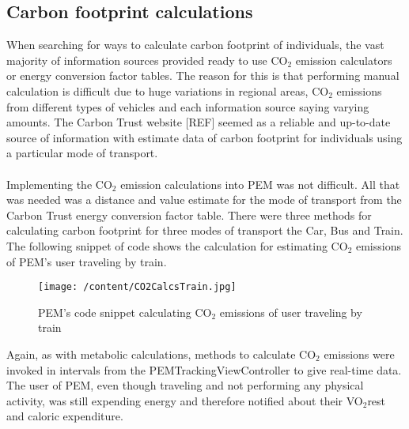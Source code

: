 \documentclass[12pt, a4paper]{report}   %
\begin{document}
\begin{enumerate}
\section{Carbon footprint calculations}
When searching for ways to calculate carbon footprint of individuals, the vast majority of information sources provided ready to use CO$_{2}$ emission calculators or energy conversion factor tables. The reason for this is that performing manual calculation is difficult due to huge variations in regional areas, CO$_{2}$ emissions from different types of vehicles and each information source saying varying amounts. The Carbon Trust website [REF] seemed as a reliable and up-to-date source of information with estimate data of carbon footprint for individuals using a particular mode of transport.\\ \\
Implementing the CO$_{2}$ emission calculations into PEM was not difficult. All that was needed was a distance and value estimate for the mode of transport from the Carbon Trust energy conversion factor table. There were three methods for calculating carbon footprint for three modes of transport the Car, Bus and Train. The following snippet of code shows the calculation for estimating CO$_{2}$ emissions of PEM's user traveling by train.


\begin{figure}[H]
  \centering
	\texttt{[image: /content/CO2CalcsTrain.jpg]}
	  \caption{PEM's code snippet calculating CO$_{2}$ emissions of user traveling by train}
\end{figure}


Again, as with metabolic calculations, methods to calculate CO$_{2}$ emissions were invoked in intervals from the PEMTrackingViewController to give real-time data.
The user of PEM, even though traveling and not performing any physical activity, was still expending energy and therefore notified about their VO$_{2}$rest and caloric expenditure.\\ \\


\clearpage

\end{enumerate}
\end{document}

